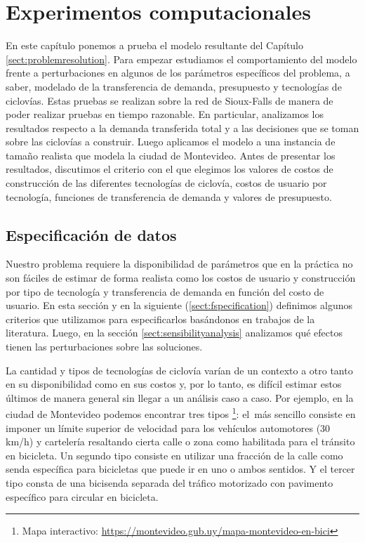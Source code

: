 \chapter{Experimentos computacionales}
\label{sect:problemresults}

En este capítulo ponemos a prueba el modelo resultante del Capítulo \ref{sect:problemresolution}. Para empezar estudiamos el comportamiento del modelo frente a perturbaciones en algunos de los parámetros específicos del problema, a saber, modelado de la transferencia de demanda, presupuesto y tecnologías de ciclovías. Estas pruebas se realizan sobre la red de Sioux-Falls de manera de poder realizar pruebas en tiempo razonable. En particular, analizamos los resultados respecto a la demanda transferida total y a las decisiones que se toman sobre las ciclovías a construir. Luego aplicamos el modelo a una instancia de tamaño realista que modela la ciudad de Montevideo. Antes de presentar los resultados, discutimos el criterio con el que elegimos los valores de costos de construcción de las diferentes tecnologías de ciclovía, costos de usuario por tecnología, funciones de transferencia de demanda y valores de presupuesto.

\section{Especificación de datos}
\label{sect:dataspecification}

Nuestro problema requiere la disponibilidad de parámetros que en la práctica no son fáciles de estimar de forma realista como los costos de usuario y construcción por tipo de tecnología y transferencia de demanda en función del costo de usuario. En esta sección y en la siguiente (\ref{sect:fspecification}) definimos algunos criterios que utilizamos para especificarlos basándonos en trabajos de la literatura. Luego, en la sección \ref{sect:sensibilityanalysis} analizamos qué efectos tienen las perturbaciones sobre las soluciones.

La cantidad y tipos de tecnologías de ciclovía varían de un contexto a otro tanto en su disponibilidad como en sus costos y, por lo tanto, es difícil estimar estos últimos de manera general sin llegar a un análisis caso a caso. Por ejemplo, en la ciudad de Montevideo podemos encontrar tres tipos \footnote{Mapa interactivo: \url{https://montevideo.gub.uy/mapa-montevideo-en-bici}}: el más sencillo consiste en imponer un límite superior de velocidad para los vehículos automotores (30 km/h) y cartelería resaltando cierta calle o zona como habilitada para el tránsito en bicicleta. Un segundo tipo consiste en utilizar una fracción de la calle como senda específica para bicicletas que puede ir en uno o ambos sentidos. Y el tercer tipo consta de una bicisenda separada del tráfico motorizado con pavimento específico para circular en bicicleta.

